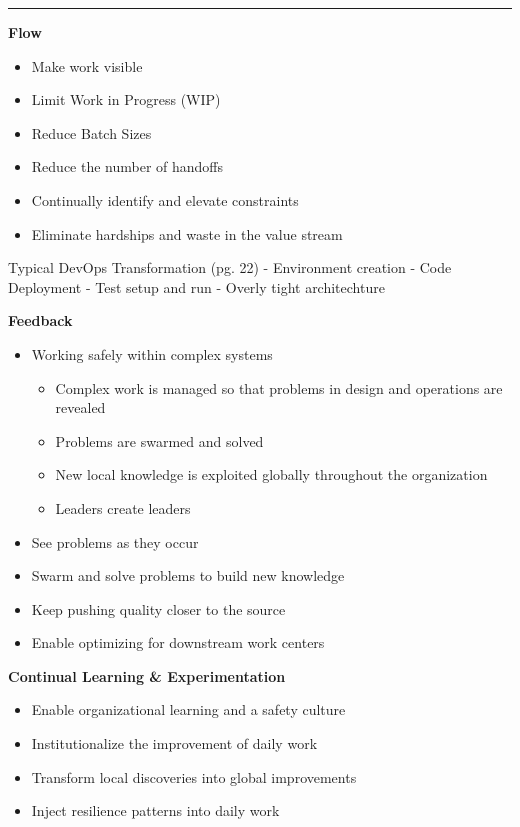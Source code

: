 \documentclass[]{book}
\providecommand{\tightlist}{%
  \setlength{\itemsep}{0pt}\setlength{\parskip}{0pt}}
\theoremstyle{definition}
\theoremstyle{definition}
\theoremstyle{definition}
\theoremstyle{remark}
\begin{document}
\begin{center}\rule{0.5\linewidth}{\linethickness}\end{center}

\textbf{Flow}

\begin{itemize}
\tightlist
\item
  Make work visible
\item
  Limit Work in Progress (WIP)
\item
  Reduce Batch Sizes
\item
  Reduce the number of handoffs
\item
  Continually identify and elevate constraints
\item
  Eliminate hardships and waste in the value stream
\end{itemize}

Typical DevOps Transformation (pg. 22) - Environment creation - Code
Deployment - Test setup and run - Overly tight architechture

\textbf{Feedback}

\begin{itemize}
\tightlist
\item
  Working safely within complex systems

  \begin{itemize}
  \tightlist
  \item
    Complex work is managed so that problems in design and operations
    are revealed
  \item
    Problems are swarmed and solved
  \item
    New local knowledge is exploited globally throughout the
    organization
  \item
    Leaders create leaders
  \end{itemize}
\item
  See problems as they occur
\item
  Swarm and solve problems to build new knowledge
\item
  Keep pushing quality closer to the source
\item
  Enable optimizing for downstream work centers
\end{itemize}

\textbf{Continual Learning \& Experimentation}

\begin{itemize}
\tightlist
\item
  Enable organizational learning and a safety culture
\item
  Institutionalize the improvement of daily work
\item
  Transform local discoveries into global improvements
\item
  Inject resilience patterns into daily work
\end{itemize}
\end{document}
